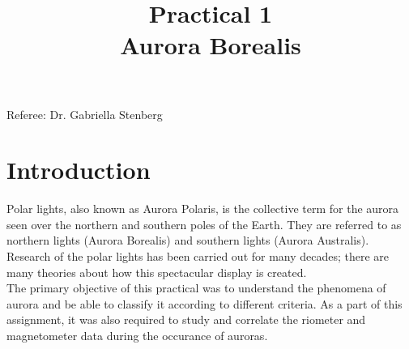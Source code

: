 \documentclass{article}
\title{Practical 1\\ Aurora Borealis} %
\author{\authors}
\begin{document}
\maketitle %

\centerline{Referee: Dr. Gabriella Stenberg}

\setlength\parindent{0pt} %

\renewcommand{\labelenumi}{\alph{enumi}.} %
\clearpage

\tableofcontents

\listoffigures

\clearpage


\section{Introduction}
Polar lights, also known as Aurora Polaris, is the collective term for the aurora seen over the northern and southern poles of the Earth. They are referred to as northern lights (Aurora Borealis) and southern lights (Aurora Australis). Research of the polar lights has been carried out for many decades; there are many theories about how this spectacular display is created. \cite{Stenberg:2012ab}\\ 
The primary objective of this practical was to understand the phenomena of aurora and be able to classify it according to different criteria. As a part of this assignment, it was also required to study and correlate the riometer and magnetometer data during the occurance of auroras.

 
\end{document}
